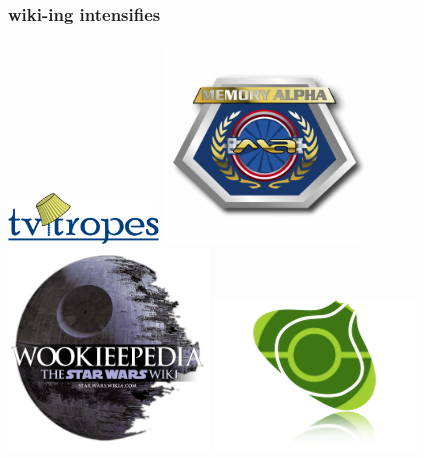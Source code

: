 \documentclass{beamer}
\begin{document}
\begin{frame}
  \frametitle{wiki-ing intensifies}
  \begin{center}
    \noindent
    \includegraphics[width = 0.3\textwidth, keepaspectratio = true]{figure/tropes}\hspace{0.2\textwidth}
    \includegraphics[width = 0.4\textwidth, height = 0.4\textheight, keepaspectratio = true]{figure/memalpha1}\\[2em]
    \includegraphics[width = 0.4\textwidth, height = 0.4\textheight, keepaspectratio = true]{figure/wookie}\hspace{0.2\textwidth}
    \includegraphics[width = 0.4\textwidth, height = 0.4\textheight, keepaspectratio = true]{figure/bulbapedia}\par
  \end{center}
\end{frame}
\end{document}
